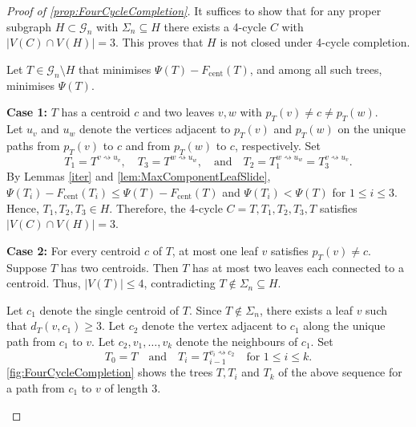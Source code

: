 \documentclass[10pt,a4paper]{amsart}
\begin{document}
		\begin{proof} [Proof of \autoref{prop:FourCycleCompletion}]
			It suffices to show that for any proper subgraph $H\subset \mathcal{G}_n$ with $\Sigma_n \subseteq H$ there exists a 4-cycle $C$ with $|V(C) \cap V(H)| = 3$. This proves that $H$ is not closed under 4-cycle completion.

			Let $T\in \mathcal{G}_n\setminus H$ that minimises $\Psi(T) - F_\mathrm{cent}(T)$, and among all such trees, minimises $\Psi(T)$. 

			\textbf{Case 1:} $T$ has a centroid $c$ and two leaves $v,w$ with $p_T(v) \neq c \neq p_T(w)$.\\
			Let $u_v$ and $u_w$ denote the vertices adjacent to $p_T(v)$ and $p_T(w)$ on the unique paths from $p_T(v)$ to $c$ and from $p_T(w)$ to $c$, respectively. Set
			\[
				T_1 = T^{v\rightsquigarrow u_v}, \quad T_3 = T^{w\rightsquigarrow u_w}, \quad \text{and} \quad T_2 = T_1^{w\rightsquigarrow u_w} = T_3^{v\rightsquigarrow u_v}.
			\]
			By Lemmas \ref{iter} and \ref{lem:MaxComponentLeafSlide}, $\Psi(T_i) - F_\mathrm{cent}(T_i) \leq \Psi(T) - F_\mathrm{cent}(T)$ and $\Psi(T_i) < \Psi(T)$ for $1\leq i \leq 3$. Hence, $T_1, T_2, T_3\in H$. Therefore, the 4-cycle $C = T, T_1, T_2, T_3, T$ satisfies $|V(C) \cap V(H)| = 3$.

			\textbf{Case 2:} For every centroid $c$ of $T$, at most one leaf $v$ satisfies $p_T(v) \neq c$.\\
			Suppose $T$ has two centroids. Then $T$ has at most two leaves each connected to a centroid. Thus, $|V(T)| \leq 4$, contradicting $T\notin \Sigma_n\subseteq H$. 
			
			Let $c_1$ denote the single centroid of $T$. Since $T\notin \Sigma_n$, there exists a leaf $v$ such that $d_T(v,c_1) \geq 3$. Let $c_2$ denote the vertex adjacent to $c_1$ along the unique path from $c_1$ to $v$. Let $c_2, v_1,\ldots, v_k$ denote the neighbours of $c_1$. Set
			\[
				T_0 = T \quad \text{and} \quad T_i = T_{i-1}^{v_i\rightsquigarrow c_2} \quad \text{for } 1\leq i\leq k.
			\]
			\autoref{fig:FourCycleCompletion} shows the trees $T, T_i$ and $T_k$ of the above sequence for a path from $c_1$ to $v$ of length 3. 
			\begin{figure}[tbp]
				\centering
				\begin{tikzpicture}[dot/.style={circle, draw, fill, inner sep=0pt, minimum size=4pt}]


\end{tikzpicture}
\end{figure}
\end{proof}
\end{document}
